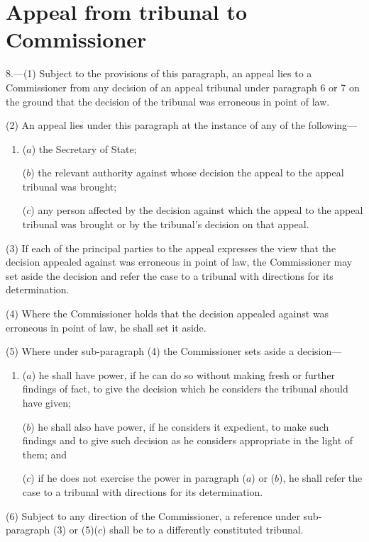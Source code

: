 \documentclass[12pt,a4paper]{article}
\begin{document}
\section*{Appeal from tribunal to Commissioner}

8.---(1) Subject to the provisions of this paragraph, an appeal lies to a Commissioner from any decision of an appeal tribunal under paragraph 6 or 7 on the ground that the decision of the tribunal was erroneous in point of law.

(2) An appeal lies under this paragraph at the instance of any of the following—
\begin{enumerate}\item[]
($a$) the Secretary of State;

($b$) the relevant authority against whose decision the appeal to the appeal tribunal was brought;

($c$) any person affected by the decision against which the appeal to the appeal tribunal was brought or by the tribunal’s decision on that appeal.
\end{enumerate}

(3) If each of the principal parties to the appeal expresses the view that the decision appealed against was erroneous in point of law, the Commissioner may set aside the decision and refer the case to a tribunal with directions for its determination.

(4) Where the Commissioner holds that the decision appealed against was erroneous in point of law, he shall set it aside.

(5) Where under sub-paragraph (4)  the Commissioner sets aside a decision—
\begin{enumerate}\item[]
($a$) he shall have power, if he can do so without making fresh or further findings of fact, to give the decision which he considers the tribunal should have given;

($b$) he shall also have power, if he considers it expedient, to make such findings and to give such decision as he considers appropriate in the light of them; and

($c$) if he does not exercise the power in paragraph ($a$)  or ($b$), he shall refer the case to a tribunal with directions for its determination.
\end{enumerate}

(6) Subject to any direction of the Commissioner, a reference under sub-paragraph (3)  or (5)($c$)  shall be to a differently constituted tribunal.
\end{document}
